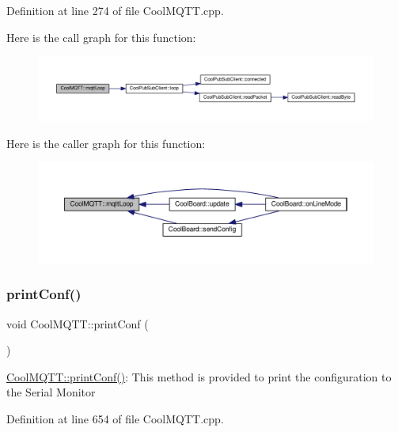 Definition at line 274 of file Cool\+M\+Q\+T\+T.\+cpp.

Here is the call graph for this function\+:
\nopagebreak
\begin{figure}[H]
\begin{center}
\leavevmode
\includegraphics[width=350pt]{class_cool_m_q_t_t_aa5eaae967b562b62cbcf2b8d81f6e5d5_cgraph}
\end{center}
\end{figure}
Here is the caller graph for this function\+:
\nopagebreak
\begin{figure}[H]
\begin{center}
\leavevmode
\includegraphics[width=350pt]{class_cool_m_q_t_t_aa5eaae967b562b62cbcf2b8d81f6e5d5_icgraph}
\end{center}
\end{figure}
\mbox{\label{class_cool_m_q_t_t_a40553a0ad4b5ecf1cb4411ab54ca85fb}} 
\subsubsection{\texorpdfstring{print\+Conf()}{printConf()}}
{\footnotesize\ttfamily void Cool\+M\+Q\+T\+T\+::print\+Conf (\begin{DoxyParamCaption}{ }\end{DoxyParamCaption})}

\hyperlink{class_cool_m_q_t_t_a40553a0ad4b5ecf1cb4411ab54ca85fb}{Cool\+M\+Q\+T\+T\+::print\+Conf()}\+: This method is provided to print the configuration to the Serial Monitor 

Definition at line 654 of file Cool\+M\+Q\+T\+T.\+cpp.

